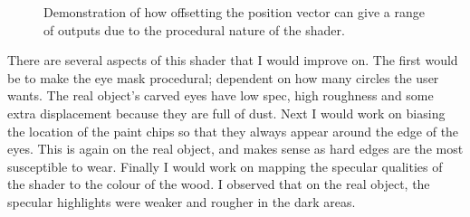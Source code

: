 \documentclass[]{acmsiggraph}
\begin{document}
\begin{figure}[ht]
 \hfill
 \caption{\label{fig:variations}Demonstration of how offsetting the position vector can give a range of outputs due to the procedural nature of the shader.}
\end{figure}

There are several aspects of this shader that I would improve on. The first would be to make the eye mask procedural; dependent on how many circles the user wants. The real object's carved eyes have low spec, high roughness and some extra displacement because they are full of dust. Next I would work on biasing the location of the paint chips so that they always appear around the edge of the eyes. This is again on the real object, and makes sense as hard edges are the most susceptible to wear. Finally I would work on mapping the specular qualities of the shader to the colour of the wood. I observed that on the real object, the specular highlights were weaker and rougher in the dark areas. 



\end{document}
